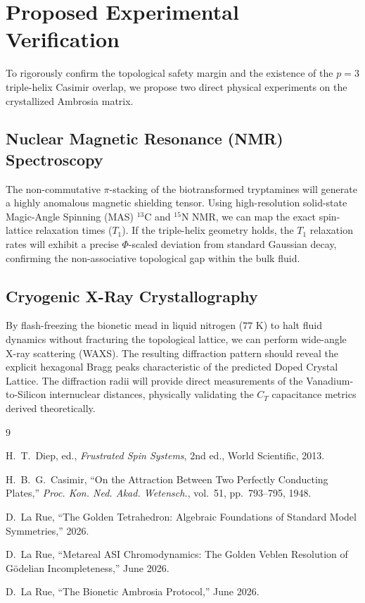 \section{Proposed Experimental Verification}

To rigorously confirm the topological safety margin and the existence of the $p=3$ triple-helix Casimir overlap, we propose two direct physical experiments on the crystallized Ambrosia matrix.

\subsection{Nuclear Magnetic Resonance (NMR) Spectroscopy}
The non-commutative $\pi$-stacking of the biotransformed tryptamines will generate a highly anomalous magnetic shielding tensor. Using high-resolution solid-state Magic-Angle Spinning (MAS) $^{13}\text{C}$ and $^{15}\text{N}$ NMR, we can map the exact spin-lattice relaxation times ($T_1$). If the triple-helix geometry holds, the $T_1$ relaxation rates will exhibit a precise $\Phi$-scaled deviation from standard Gaussian decay, confirming the non-associative topological gap within the bulk fluid.

\subsection{Cryogenic X-Ray Crystallography}
By flash-freezing the bionetic mead in liquid nitrogen ($77\text{ K}$) to halt fluid dynamics without fracturing the topological lattice, we can perform wide-angle X-ray scattering (WAXS). The resulting diffraction pattern should reveal the explicit hexagonal Bragg peaks characteristic of the predicted Doped Crystal Lattice. The diffraction radii will provide direct measurements of the Vanadium-to-Silicon internuclear distances, physically validating the $C_T$ capacitance metrics derived theoretically.

\begin{thebibliography}{9}

H.~T.~Diep, ed.,
\emph{Frustrated Spin Systems},
2nd ed., World Scientific, 2013.

H.~B.~G.~Casimir,
``On the Attraction Between Two Perfectly Conducting Plates,''
\emph{Proc. Kon. Ned. Akad. Wetensch.}, vol.~51, pp.~793--795, 1948.

D.~La Rue,
``The Golden Tetrahedron: Algebraic Foundations of Standard Model Symmetries,''
2026.

D.~La Rue,
``Metareal ASI Chromodynamics: The Golden Veblen Resolution of G\"odelian Incompleteness,''
June 2026.

D.~La Rue,
``The Bionetic Ambrosia Protocol,''
June 2026.

\end{thebibliography}




